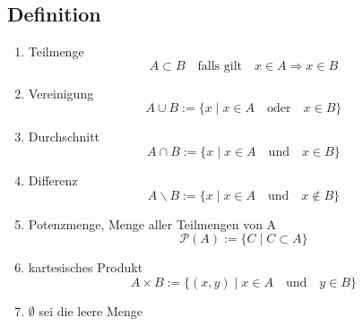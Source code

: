 \subsection{Definition}
\renewcommand{\labelenumi}{(\roman{enumi})}


\begin{enumerate}
 
\item Teilmenge
\begin{displaymath} 
A \subset B \quad \mbox{falls gilt} \quad x \in A \Rightarrow x\in B
\end{displaymath}

\item Vereinigung
\begin{displaymath}
A \cup B := \{ x \mid x \in A  \quad \mbox{oder} \quad x \in B \}
\end{displaymath}

\item Durchschnitt
\begin{displaymath}
A \cap B := \{ x \mid x \in A \quad \mbox{und} \quad x \in B \} 
\end{displaymath}

\item Differenz
\begin{displaymath}
A \backslash B := \{ x \mid x \in A \quad \mbox{und} \quad x \not\in B \}
\end{displaymath}

\item Potenzmenge, Menge aller Teilmengen von A
\begin{displaymath}
\mathcal{P}(A) := \{ C \mid C \subset A\}
\end{displaymath}

\item kartesisches Produkt
\begin{displaymath}
A \times B := \{ (x,y) \mid x \in A \quad \mbox{und} \quad y \in B \}
\end{displaymath}

\item 
\( \emptyset \) sei die leere Menge

\end{enumerate}


